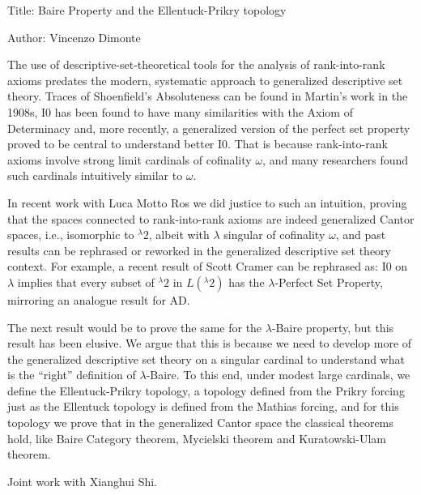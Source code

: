 \documentclass[12pt]{article}
\begin{document}
Title: Baire Property and the Ellentuck-Prikry topology

Author: Vincenzo Dimonte

The use of descriptive-set-theoretical tools for the analysis of rank-into-rank axioms predates the modern, systematic approach to generalized descriptive set theory. Traces of Shoenfield's Absoluteness can be found in Martin's work in the 1908s, I0 has been found to have many similarities with the Axiom of Determinacy and, more recently, a generalized version of the perfect set property proved to be central to understand better I0. That is because rank-into-rank axioms involve strong limit cardinals of cofinality $\omega$, and many researchers found such cardinals intuitively similar to $\omega$.

In recent work with Luca Motto Ros we did justice to such an intuition, proving that the spaces connected to rank-into-rank axioms are indeed generalized Cantor spaces, i.e., isomorphic to ${}^\lambda 2$, albeit with $\lambda$ singular of cofinality $\omega$, and past results can be rephrased or reworked in the generalized descriptive set theory context. For example, a recent result of Scott Cramer can be rephrased as: I0 on $\lambda$ implies that every subset of ${}^\lambda 2$ in $L({}^\lambda 2)$ has the $\lambda$-Perfect Set Property, mirroring an analogue result for AD.

The next result would be to prove the same for the $\lambda$-Baire property, but this result has been elusive. We argue that this is because we need to develop more of the generalized descriptive set theory on a singular cardinal to understand what is the ``right'' definition of $\lambda$-Baire. To this end, under modest large cardinals, we define the Ellentuck-Prikry topology, a topology defined from the Prikry forcing just as the Ellentuck topology is defined from the Mathias forcing, and for this topology we prove that in the generalized Cantor space the classical theorems hold, like Baire Category theorem, Mycielski theorem and Kuratowski-Ulam theorem.  

Joint work with Xianghui Shi.
\end{document}
